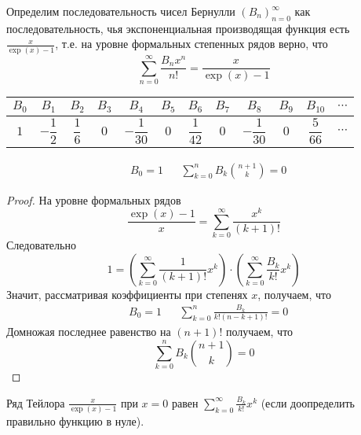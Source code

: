 \documentclass[12pt,a4paper]{article}
\begin{document}
    \begin{definition}
        Определим последовательность чисел Бернулли $(B_n)_{n=0}^\infty$ как последовательность, чья экспоненциальная производящая функция есть $\frac{x}{\exp(x) - 1}$, т.е. на уровне формальных степенных рядов верно, что
        \[\sum_{n=0}^\infty \frac{B_n x^n}{n!} = \frac{x}{\exp(x) - 1}\]

        \begin{table}[H]
            \centering
            \begin{tabular}{c|c|c|c|c|c|c|c|c|c|c|c}
                $B_0$ & $B_1$ & $B_2$ & $B_3$ & $B_4$ & $B_5$ & $B_6$ & $B_7$ & $B_8$ & $B_9$ & $B_{10}$ & $\cdots$\\
                \hline
                \rule[-10pt]{0pt}{30pt} $1$ & $-\dfrac{1}{2}$ & $\dfrac{1}{6}$ & $0$ & $-\dfrac{1}{30}$ & $0$ & $\dfrac{1}{42}$ & $0$ & $-\dfrac{1}{30}$ & $0$ & $\dfrac{5}{66}$ & $\cdots$
            \end{tabular}
        \end{table}
    \end{definition}

    \begin{lemma}
        \begin{align*}
            &B_0 = 1&
            &\sum_{k=0}^n B_k \binom{n+1}{k} = 0
        \end{align*}
    \end{lemma}

    \begin{proof}
        На уровне формальных рядов
        \[\frac{\exp(x) - 1}{x} = \sum_{k=0}^\infty \frac{x^k}{(k+1)!}\]
        Следовательно
        \[1 = \left(\sum_{k=0}^\infty \frac{1}{(k+1)!} x^k\right) \cdot \left(\sum_{k=0}^\infty \frac{B_k}{k!}x^k\right)\]
        Значит, рассматривая коэффициенты при степенях $x$, получаем, что
        \begin{align*}
            &B_0 = 1&
            &\sum_{k=0}^n \frac{B_k}{k!(n-k+1)!} = 0
        \end{align*}
        Домножая последнее равенство на $(n+1)!$ получаем, что
        \[\sum_{k=0}^n B_k \binom{n+1}{k} = 0\]
    \end{proof}

    \begin{lemma}
        Ряд Тейлора $\frac{x}{\exp(x) - 1}$ при $x = 0$ равен $\sum_{k=0}^\infty \frac{B_k}{k!}x^k$ (если доопределить правильно функцию в нуле).
    \end{lemma}
\end{document}
